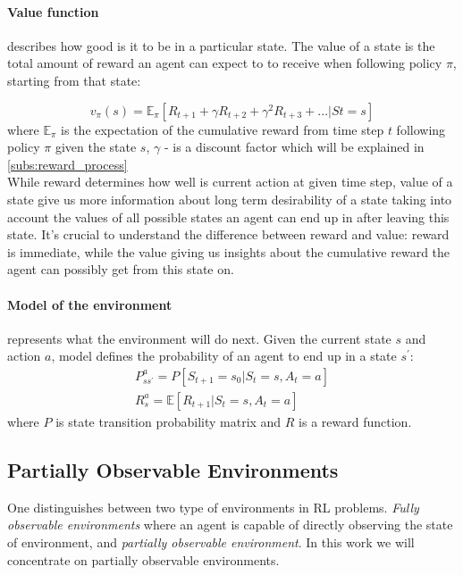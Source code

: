 
\paragraph{Value function} describes how good is it to be in a particular state.
The value of a state is the total amount of reward an agent can expect to
to receive when following policy $\pi$, starting from that state:

\begin{equation} \label{eq:markov_propert}
	v_{\pi}(s) = \mathbb{E}_{\pi} [R_{t+1} + \gamma R_{t+2} + \gamma^2 R_{t+3} + ... | St = s]
\end{equation}
where $\mathbb{E}_{\pi}$ is the expectation of the cumulative reward from time step $t$
following policy $\pi$ given the state $s$, $\gamma$ - is a discount factor which will be explained in \autoref{subs:reward_process}\\
While reward determines how well is current action at given time step, value of a state
give us more information about long term desirability of a state taking into account
the values of all possible states an agent can end up in after leaving this state.
It's crucial to understand the difference between reward and value: reward is immediate,
while the value giving us insights about the cumulative reward the agent can possibly get
from this state on.

\paragraph{Model of the environment} represents what the environment will do next. Given
the current state $s$ and action $a$, model defines the probability of an agent to end up in
a state $s^\prime$:
\begin{align} \label{eq:markov_propert}
P^a_{ss^{\prime}} = P[S_{t+1} = s_0 | S_t = s, A_t = a] \\
R^a_s = \mathbb{E}[R_{t+1} | S_t = s, A_t = a]
\end{align}
where $P$ is state transition probability matrix and $R$ is a reward function.

\subsection{Partially Observable Environments}
One distinguishes between two type of environments in RL problems.
\emph{Fully observable environments} where an agent is capable of directly observing the state of environment,
and \emph{partially observable environment}. In this work we will concentrate
on partially observable environments.


